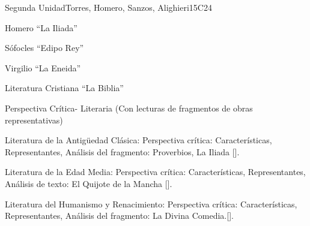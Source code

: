 \begin{syllabus}
\begin{unit}{}{Segunda Unidad}{Torres, Homero, Sanzos, Alighieri}{15}{C24}
\begin{topics}
	\item Homero ``La Iliada''
	\item Sófocles ``Edipo Rey''
	\item Virgilio ``La Eneida''
	\item Literatura Cristiana ``La Biblia''
\end{topics}
\begin{learningoutcomes}
	\item Perspectiva Crítica- Literaria (Con lecturas de fragmentos de obras representativas)
	\item Literatura de la Antigüedad Clásica: Perspectiva crítica: Características, Representantes, Análisis del fragmento: Proverbios, La Iliada [\Usage].
	\item Literatura de la Edad Media: Perspectiva crítica: Características, Representantes, Análisis de texto: El Quijote de la Mancha [\Usage].
	\item Literatura del Humanismo y Renacimiento: Perspectiva crítica: Características, Representantes, Análisis del fragmento: La Divina Comedia.[\Usage].
\end{learningoutcomes}
\end{unit}


\end{syllabus}
